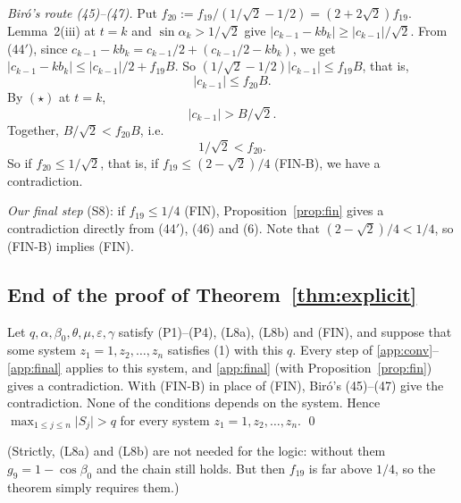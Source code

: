 \documentclass[11pt]{amsart}
\theoremstyle{remark}
\theoremstyle{plain}
\newcommand{\abs}[1]{\lvert #1\rvert}
\newcommand{\eps}{\varepsilon}
\begin{document}
\emph{Bir\'o's route (45)--(47).} Put $f_{20}:=f_{19}/(1/\sqrt2-1/2)=(2+2\sqrt2)f_{19}$. Lemma~2(iii) at $t=k$ and $\sin\alpha_k>1/\sqrt2$ give $\abs{c_{k-1}-kb_k}\ge\abs{c_{k-1}}/\sqrt2$. From (44$'$), since $c_{k-1}-kb_k=c_{k-1}/2+(c_{k-1}/2-kb_k)$, we get $\abs{c_{k-1}-kb_k}\le\abs{c_{k-1}}/2+f_{19}B$. So $(1/\sqrt2-1/2)\abs{c_{k-1}}\le f_{19}B$, that is,
\begin{equation}\tag{45}
\abs{c_{k-1}}\le f_{20}B .
\end{equation}
By $(\star)$ at $t=k$,
\begin{equation}\tag{46}
\abs{c_{k-1}}>B/\sqrt2 .
\end{equation}
Together, $B/\sqrt2<f_{20}B$, i.e.
\begin{equation}\tag{47}
1/\sqrt2<f_{20}.
\end{equation}
So if $f_{20}\le1/\sqrt2$, that is, if $f_{19}\le(2-\sqrt2)/4$ (FIN-B), we have a contradiction.

\emph{Our final step} (S8): if $f_{19}\le1/4$ (FIN), Proposition~\ref{prop:fin} gives a contradiction directly from (44$'$), (46) and (6). Note that $(2-\sqrt2)/4<1/4$, so (FIN-B) implies (FIN).

\subsection{End of the proof of Theorem~\ref{thm:explicit}}\label{app:end}
Let $q,\alpha,\beta_0,\theta,\mu,\eps,\gamma$ satisfy (P1)--(P4), (L8a), (L8b) and (FIN), and suppose that some system $z_1=1,z_2,\dots,z_n$ satisfies (1) with this $q$. Every step of \ref{app:conv}--\ref{app:final} applies to this system, and \ref{app:final} (with Proposition~\ref{prop:fin}) gives a contradiction. With (FIN-B) in place of (FIN), Bir\'o's (45)--(47) give the contradiction. None of the conditions depends on the system. Hence $\max_{1\le j\le n}\abs{S_j}>q$ for every system $z_1=1,z_2,\dots,z_n$. \qed

(Strictly, (L8a) and (L8b) are not needed for the logic: without them $g_9=1-\cos\beta_0$ and the chain still holds. But then $f_{19}$ is far above $1/4$, so the theorem simply requires them.)
\end{document}
